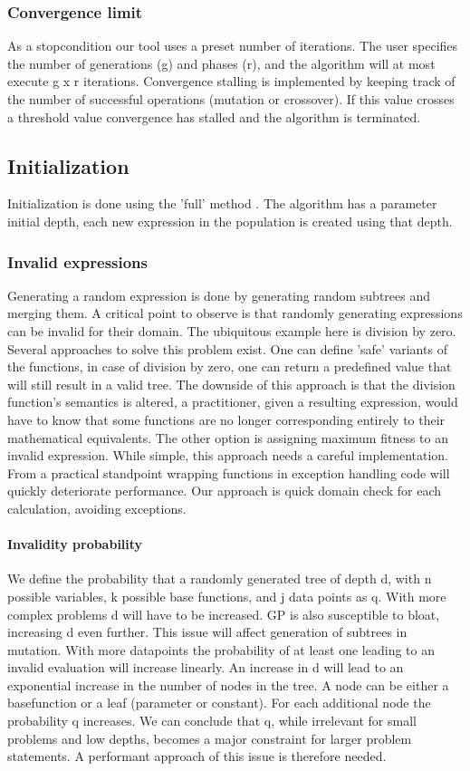 \subsubsection{Convergence limit}
As a stopcondition our tool uses a preset number of iterations. The user specifies the number of generations (g) and phases (r), and the algorithm will at most execute g x r iterations. Convergence stalling is implemented by keeping track of the number of successful operations (mutation or crossover). If this value crosses a threshold value convergence has stalled and the algorithm is terminated.


\subsection{Initialization}
Initialization is done using the 'full' method \cite{GP}. The algorithm has a parameter initial depth, each new expression in the population is created using that depth.
 
\subsubsection{Invalid expressions}
Generating a random expression is done by generating random subtrees and merging them. A critical point to observe is that randomly generating expressions can be invalid for their domain. The ubiquitous example here is division by zero. Several approaches to solve this problem exist. One can define 'safe' variants of the functions, in case of division by zero, one can return a predefined value that will still result in a valid tree. The downside of this approach is that the division function's semantics is altered, a practitioner, given a resulting expression, would have to know that some functions are no longer corresponding entirely to their mathematical equivalents. 
The other option is assigning maximum fitness to an invalid expression. While simple, this approach needs a careful implementation. From a practical standpoint wrapping functions in exception handling code will quickly deteriorate performance. 
Our approach is quick domain check for each calculation, avoiding exceptions.

\paragraph{Invalidity probability}
We define the probability that a randomly generated tree of depth d, with n possible variables, k possible base functions, and j data points as q. With more complex problems d will have to be increased. GP is also susceptible to bloat, increasing d even further. This issue will affect generation of subtrees in mutation. With more datapoints the probability of at least one leading to an invalid evaluation will increase linearly. An increase in d will lead to an exponential increase in the number of nodes in the tree. A node can be either a basefunction or a leaf (parameter or constant). For each additional node the probability q increases. We can conclude that q, while irrelevant for small problems and low depths, becomes a major constraint for larger problem statements. A performant approach of this issue is therefore needed.

